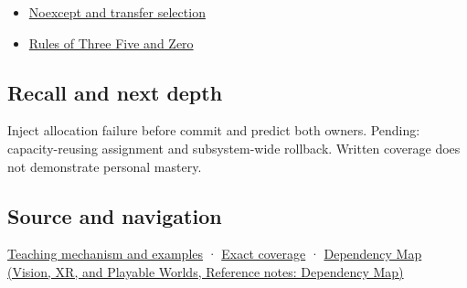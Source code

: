 \begin{itemize}
\tightlist
\item
  \hyperref[appendix-c746afaa47d1]{Noexcept and transfer selection}
\item
  \hyperref[appendix-7679107d057e]{Rules of Three Five and Zero}
\end{itemize}

\subsection{Recall and next depth}\label{appendix-bea6beb5350f-recall-and-next-depth}

Inject allocation failure before commit and predict both owners. Pending: capacity-reusing assignment and subsystem-wide rollback. Written coverage does not demonstrate personal mastery.

\subsection{Source and navigation}\label{appendix-bea6beb5350f-source-and-navigation}

\hyperref[01-foundations-i-ch003-replacing-a-value-is-not-creating-an-object]{Teaching mechanism and examples} · \hyperref[appendix-fd090d982a15-m009---parts-127-147]{Exact coverage} · \href{../07-Vision-XR-and-Playable-Worlds/main.pdf\#nameddest=appendix-4ad47bdd269a}{Dependency Map (Vision, XR, and Playable Worlds, Reference notes: Dependency Map)}
